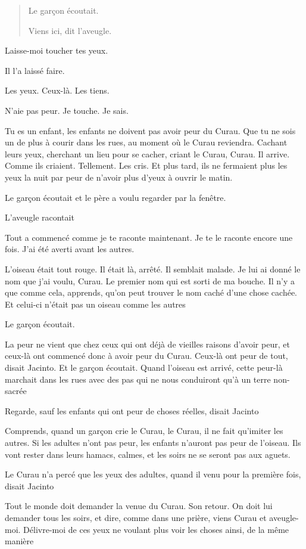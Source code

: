 \begin{quote}
Le garçon écoutait.

Viens ici, dit l'aveugle.
\end{quote}

Laisse-moi toucher tes yeux.

Il l'a laissé faire.

Les yeux. Ceux-là. Les tiens.

N'aie pas peur. Je touche. Je sais.

Tu es un enfant, les enfants ne doivent pas avoir peur du Curau. Que tu
ne sois un de plus à courir dans les rues, au moment où le Curau
reviendra. Cachant leurs yeux, cherchant un lieu pour se cacher, criant
le Curau, Curau. Il arrive. Comme ils criaient. Tellement. Les cris. Et
plus tard, ils ne fermaient plus les yeux la nuit par peur de n'avoir
plus d'yeux à ouvrir le matin.

Le garçon écoutait et le père a voulu regarder par la fenêtre.

L'aveugle racontait

Tout a commencé comme je te raconte maintenant. Je te le raconte encore
une fois. J'ai été averti avant les autres.

L'oiseau était tout rouge. Il était là, arrêté. Il semblait malade. Je
lui ai donné le nom que j'ai voulu, Curau. Le premier nom qui est sorti
de ma bouche. Il n'y a que comme cela, apprends, qu'on peut trouver le
nom caché d'une chose cachée. Et celui-ci n'était pas un oiseau comme
les autres

Le garçon écoutait.

La peur ne vient que chez ceux qui ont déjà de vieilles raisons d'avoir
peur, et ceux-là ont commencé donc à avoir peur du Curau. Ceux-là ont
peur de tout, disait Jacinto. Et le garçon écoutait. Quand l'oiseau est
arrivé, cette peur-là marchait dans les rues avec des pas qui ne nous
conduiront qu'à un terre non-sacrée

Regarde, sauf les enfants qui ont peur de choses réelles, disait Jacinto

Comprends, quand un garçon crie le Curau, le Curau, il ne fait qu'imiter
les autres. Si les adultes n'ont pas peur, les enfants n'auront pas peur
de l'oiseau. Ils vont rester dans leurs hamacs, calmes, et les soirs ne
se seront pas aux aguets.

Le Curau n'a percé que les yeux des adultes, quand il venu pour la
première fois, disait Jacinto

Tout le monde doit demander la venue du Curau. Son retour. On doit lui
demander tous les soirs, et dire, comme dans une prière, viens Curau et
aveugle-moi. Délivre-moi de ces yeux ne voulant plus voir les choses
ainsi, de la même manière

